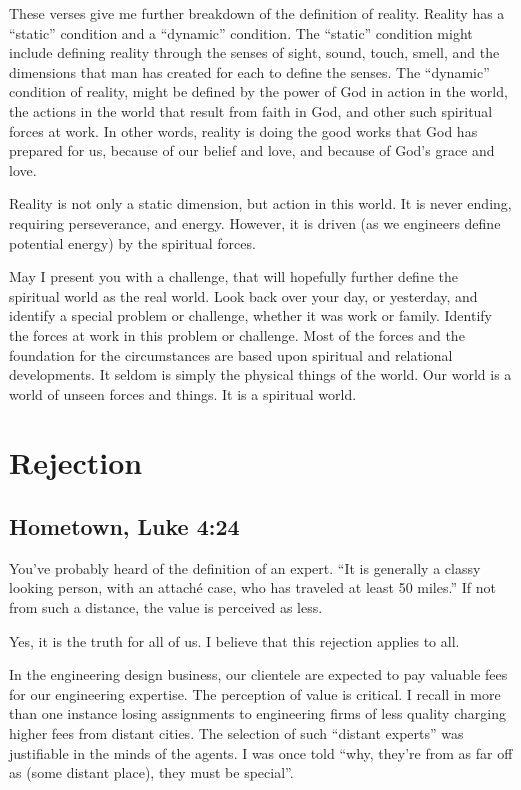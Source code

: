 \documentclass[12pt]{memoir}
\begin{document}
These verses give me further breakdown of the definition of reality.
Reality has a ``static'' condition and a ``dynamic'' condition.
The ``static'' condition might include defining reality through
the senses of sight, sound, touch, smell, and the dimensions that
man has created for each to define the senses. The ``dynamic'' condition
of reality, might be defined by the power of God in action in the
world, the actions in the world that result from faith in God, and
other such spiritual forces at work. In other words, reality is doing
the good works that God has prepared for us, because of our belief
and love, and because of God's grace and love.

Reality is not only a static dimension, but action in this world.
It is never ending, requiring perseverance, and energy. However, it
is driven (as we engineers define potential energy) by the spiritual
forces. 

May I present you with a challenge, that will hopefully further define
the spiritual world as the real world. Look back over your day, or
yesterday, and identify a special problem or challenge, whether it
was work or family. Identify the forces at work in this problem or
challenge. Most of the forces and the foundation for the circumstances
are based upon spiritual and relational developments. It seldom is
simply the physical things of the world. Our world is a world of unseen
forces and things. It is a spiritual world.

\section{Rejection}

\subsection[Hometown]{Hometown, Luke 4:24}

You've probably heard of the definition of an expert. ``It is generally a classy looking person, with an attaché case, who has traveled at least 50 miles.'' If not from such a distance, the value is perceived as less.

Yes, it is the truth for all of us. I believe that this rejection applies to all. 

In the engineering design business, our clientele are expected to
pay valuable fees for our engineering expertise. The perception of
value is critical. I recall in more than one instance losing assignments
to engineering firms of less quality charging higher fees from
distant cities. The selection of such ``distant experts'' was justifiable
in the minds of the agents. I was once told ``why, they're from as far off as (some distant place), they must be special''.
\end{document}
